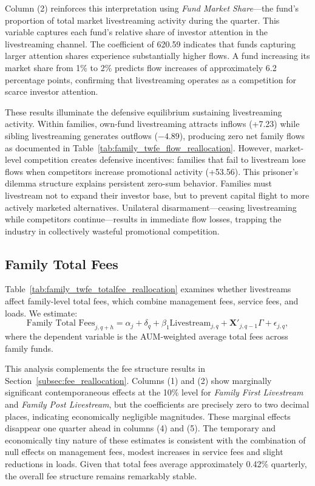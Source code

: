 \documentclass[12pt]{article}
\begin{document}
Column (2) reinforces this interpretation using \textit{Fund Market Share}—the fund's proportion of total market livestreaming activity during the quarter. This variable captures each fund's relative share of investor attention in the livestreaming channel. The coefficient of 620.59 indicates that funds capturing larger attention shares experience substantially higher flows. A fund increasing its market share from 1\% to 2\% predicts flow increases of approximately 6.2 percentage points, confirming that livestreaming operates as a competition for scarce investor attention.

These results illuminate the defensive equilibrium sustaining livestreaming activity. Within families, own-fund livestreaming attracts inflows (+7.23) while sibling livestreaming generates outflows ($-4.89$), producing zero net family flows as documented in Table~\ref{tab:family_twfe_flow_reallocation}. However, market-level competition creates defensive incentives: families that fail to livestream lose flows when competitors increase promotional activity (+53.56). This prisoner's dilemma structure explains persistent zero-sum behavior. Families must livestream not to expand their investor base, but to prevent capital flight to more actively marketed alternatives. Unilateral disarmament—ceasing livestreaming while competitors continue—results in immediate flow losses, trapping the industry in collectively wasteful promotional competition.

\subsection{Family Total Fees}\label{subsec:totalfee_appendix}

Table~\ref{tab:family_twfe_totalfee_reallocation} examines whether livestreams affect family-level total fees, which combine management fees, service fees, and loads. We estimate:
\begin{equation}
    \label{eq:family_totalfee_appendix}
    \text{Family Total Fees}_{j,q+h} = \alpha_j + \delta_q + \beta_1 \text{Livestream}_{j,q} + \mathbf{X}'_{j,q-1} \Gamma + \epsilon_{j,q},
\end{equation}
where the dependent variable is the AUM-weighted average total fees across family funds. 

This analysis complements the fee structure results in Section~\ref{subsec:fee_reallocation}. Columns (1) and (2) show marginally significant contemporaneous effects at the 10\% level for \textit{Family First Livestream} and \textit{Family Post Livestream}, but the coefficients are precisely zero to two decimal places, indicating economically negligible magnitudes. These marginal effects disappear one quarter ahead in columns (4) and (5). The temporary and economically tiny nature of these estimates is consistent with the combination of null effects on management fees, modest increases in service fees and slight reductions in loads. Given that total fees average approximately 0.42\% quarterly, the overall fee structure remains remarkably stable.
\end{document}
